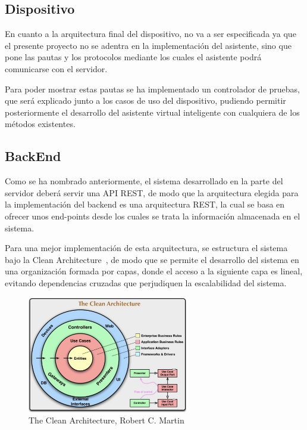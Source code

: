 \subsection{Dispositivo}

En cuanto a la arquitectura final del dispositivo, no va a ser especificada ya que el presente proyecto no se adentra en la implementación del asistente, sino que pone las pautas y los protocolos mediante los cuales el asistente podrá comunicarse con el servidor.

Para poder mostrar estas pautas se ha implementado un controlador de pruebas, que será explicado junto a los casos de uso del dispositivo, pudiendo permitir posteriormente el desarrollo del asistente virtual inteligente con cualquiera de los métodos existentes.

\subsection{BackEnd} \label{arch-be}

Como se ha nombrado anteriormente, el sistema desarrollado en la parte del servidor deberá servir una API REST, de modo que la arquitectura elegida para la implementación del backend es una arquitectura REST, la cual se basa en ofrecer unos end-points desde los cuales se trata la información almacenada en el sistema.

Para una mejor implementación de esta arquitectura, se estructura el sistema bajo la Clean Architecture~\cite{clean-arch-book}, de modo que se permite el desarrollo del sistema en una organización formada por capas, donde el acceso a la siguiente capa es lineal, evitando dependencias cruzadas que perjudiquen la escalabilidad del sistema.

\begin{figure}[h!]
    \centering
    \includegraphics[width=7cm]{./img/arch/cleanarch.png}
    \caption{The Clean Architecture, Robert C. Martin~\cite{clean-arch-book}}
    \label{fig:cleanarch}
\end{figure}

